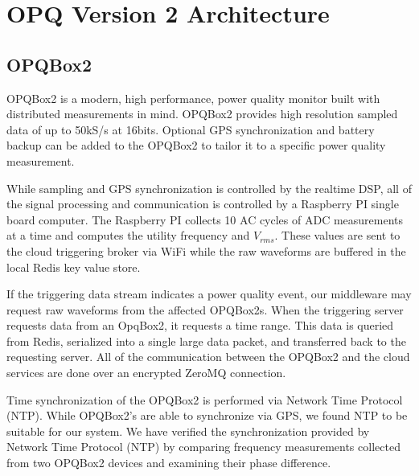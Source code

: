 \documentclass[a4paper, conference]{IEEEtran}
\begin{document}
\section{OPQ Version 2 Architecture}
\subsection{OPQBox2}
OPQBox2 is a modern, high performance, power quality monitor built with distributed measurements in mind. OPQBox2 provides high resolution sampled data of up to 50kS/s at 16bits. Optional GPS synchronization and battery backup can be added to the OPQBox2 to tailor it to a specific power quality measurement. 

While sampling and GPS synchronization is controlled by the realtime DSP, all of the signal processing and communication is controlled by a Raspberry PI single board computer. The Raspberry PI collects 10 AC cycles of ADC measurements at a time and computes the utility frequency and $V_{rms}$. These values are sent to the cloud triggering broker via WiFi while the raw waveforms are buffered in the local Redis key value store.


If the triggering data stream indicates a power quality event, our middleware may request raw waveforms from the affected OPQBox2s. When the triggering server requests data from an OpqBox2, it requests a time range. This data is queried from Redis, serialized into a single large data packet, and transferred back to the requesting server. All of the communication between the OPQBox2 and the cloud services are done over an encrypted ZeroMQ connection\cite{fengping2012distributed}.

Time synchronization of the OPQBox2 is performed via Network Time Protocol (NTP)\cite{mills1991internet}. While OPQBox2's are able to synchronize via GPS, we found NTP to be suitable for our system. We have verified the synchronization provided by Network Time Protocol (NTP) by comparing frequency measurements collected from two OPQBox2 devices and examining their phase difference.

\end{document}
